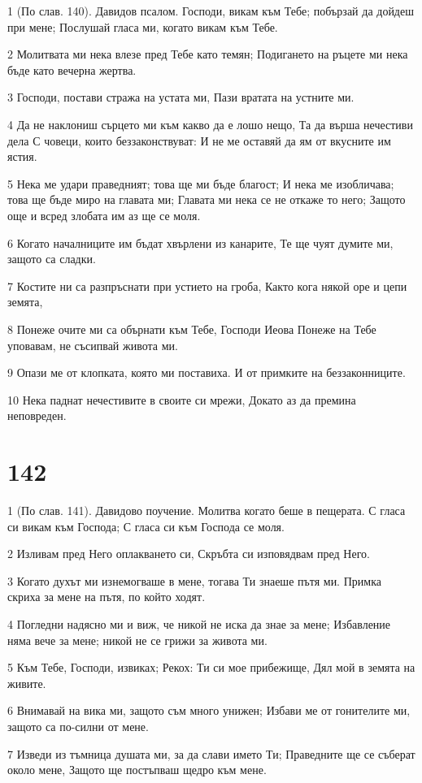 \par 1 (По слав. 140). Давидов псалом. Господи, викам към Тебе; побързай да дойдеш при мене; Послушай гласа ми, когато викам към Тебе.
\par 2 Молитвата ми нека влезе пред Тебе като темян; Подигането на ръцете ми нека бъде като вечерна жертва.
\par 3 Господи, постави стража на устата ми, Пази вратата на устните ми.
\par 4 Да не наклониш сърцето ми към какво да е лошо нещо, Та да върша нечестиви дела С човеци, които беззаконствуват: И не ме оставяй да ям от вкусните им ястия.
\par 5 Нека ме удари праведният; това ще ми бъде благост; И нека ме изобличава; това ще бъде миро на главата ми; Главата ми нека се не откаже то него; Защото още и всред злобата им аз ще се моля.
\par 6 Когато началниците им бъдат хвърлени из канарите, Те ще чуят думите ми, защото са сладки.
\par 7 Костите ни са разпръснати при устието на гроба, Както кога някой оре и цепи земята,
\par 8 Понеже очите ми са обърнати към Тебе, Господи Иеова Понеже на Тебе уповавам, не съсипвай живота ми.
\par 9 Опази ме от клопката, която ми поставиха. И от примките на беззаконниците.
\par 10 Нека паднат нечестивите в своите си мрежи, Докато аз да премина неповреден.

\chapter{142}

\par 1 (По слав. 141). Давидово поучение. Молитва когато беше в пещерата. С гласа си викам към Господа; С гласа си към Господа се моля.
\par 2 Изливам пред Него оплакването си, Скръбта си изповядвам пред Него.
\par 3 Когато духът ми изнемогваше в мене, тогава Ти знаеше пътя ми. Примка скриха за мене на пътя, по който ходят.
\par 4 Погледни надясно ми и виж, че никой не иска да знае за мене; Избавление няма вече за мене; никой не се грижи за живота ми.
\par 5 Към Тебе, Господи, извиках; Рекох: Ти си мое прибежище, Дял мой в земята на живите.
\par 6 Внимавай на вика ми, защото съм много унижен; Избави ме от гонителите ми, защото са по-силни от мене.
\par 7 Изведи из тъмница душата ми, за да слави името Ти; Праведните ще се съберат около мене, Защото ще постъпваш щедро към мене.


